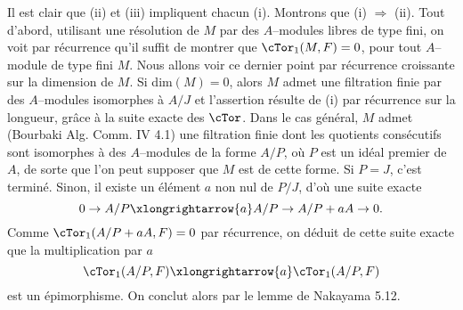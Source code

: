 Il est clair que (ii) et (iii) impliquent chacun (i). Montrons que (i) $\Rightarrow$ (ii). Tout d'abord, utilisant une résolution de $M$ par des $A$--modules libres de type fini, on voit par récurrence qu'il suffit de montrer que $\cTor_1(M, F) =  0$, pour tout $A$--module de type fini $M$. Nous allons voir ce dernier point par récurrence croissante sur la dimension de $M$. Si dim$(M) = 0$, alors $M$ admet une filtration finie par des $A$--modules isomorphes à $A/J$ et l'assertion résulte de (i) par récurrence sur la longueur, grâce à la suite exacte des $\cTor$. Dans le cas général, $M$ admet (Bourbaki Alg. Comm. IV 4.1) une filtration finie dont les quotients consécutifs sont isomorphes à des $A$--modules de la forme $A/P$, où $P$ est un idéal premier de $A$, de sorte que l'on peut supposer que $M$ est de cette forme. Si $P = J$, c'est terminé. Sinon, il existe un élément $a$ non nul de $P/J$, d'où une suite exacte
$$
0 \to A/P \xlongrightarrow{a} A/P \to A/P+aA \to 0.
$$
Comme $\cTor_1(A/P+aA, F) = 0$ par récurrence, on déduit de cette suite exacte que la multiplication par $a$
$$
\cTor_1(A/P, F) \xlongrightarrow{a} \cTor_1(A/P, F)
$$
est un épimorphisme. On conclut alors par le lemme de Nakayama 5.12.

